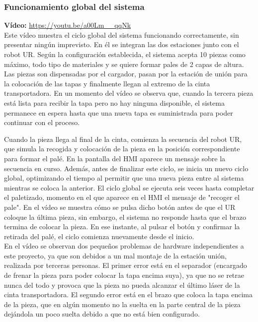 \clearpage

\subsubsection{Funcionamiento global del sistema}

\textbf{Vídeo:} \url{https://youtu.be/a00Lm__qqNk} \\

Este vídeo muestra el ciclo global del sistema funcionando correctamente, sin presentar ningún imprevisto. En él se integran las dos estaciones junto con el robot UR. Según la configuración establecida, el sistema acepta 10 piezas como máximo, todo tipo de materiales y se quiere formar pales de 2 capas de altura. Las piezas son dispensadas por el cargador, pasan por la estación de unión para la colocación de las tapas y finalmente llegan al extremo de la cinta transportadora. En un momento del vídeo se observa que, cuando la tercera pieza está lista para recibir la tapa pero no hay ninguna disponible, el sistema permanece en espera hasta que una nueva tapa es suministrada para poder continuar con el proceso. 

Cuando la pieza llega al final de la cinta, comienza la secuencia del robot UR, que simula la recogida y  colocación de la pieza en la posición correspondiente para formar el palé. En la pantalla del HMI aparece un mensaje sobre la secuencia en curso. Además, antes de finalizar este ciclo, se inicia un nuevo ciclo global, optimizando el tiempo al permitir que una nueva pieza entre al sistema mientras se coloca la anterior. El ciclo global se ejecuta seis veces hasta completar el paletizado, momento en el que aparece en el HMI el mensaje de "recoger el pale". En el vídeo se muestra cómo se pulsa dicho botón antes de que el UR coloque la última pieza, sin embargo, el sistema no responde hasta que el brazo termina de colocar la pieza. En ese instante, al pulsar el botón y confirmar la retirada del palé, el ciclo comienza nuevamente desde el inicio. \\

En el vídeo se observan dos pequeños problemas de hardware independientes a este proyecto, ya que son debidos a un mal montaje de la estación unión, realizada por terceras personas. El primer error está en el separador (encargado de frenar la pieza para poder colocar la tapa encima suya), ya que no se retrae nunca del todo y provoca que la pieza no pueda alcanzar el último láser de la cinta transportadora. El segundo error está en el brazo que coloca la tapa encima de la pieza, que en algún momento no la suelta en la parte central de la pieza dejándola un poco suelta debido a que no está bien configurado. 


